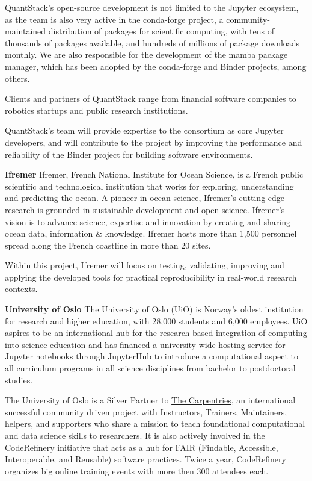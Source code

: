 QuantStack's open-source development is not limited to the Jupyter ecosystem, as the team
is also very active in the conda-forge project, a community-maintained distribution
of packages for scientific computing, with tens of thousands of packages available,
and hundreds of millions of package downloads monthly. We are also responsible for
the development of the mamba package manager, which has been adopted by the conda-forge
and Binder projects, among others.

Clients and partners of QuantStack range from financial software companies to robotics
startups and public research institutions.

QuantStack's team will provide expertise to the consortium as core Jupyter developers,
and will contribute to the project by improving the performance and reliability of the
Binder project for building software environments.

\noindent \textbf{Ifremer}
Ifremer, French National Institute for Ocean Science, is a French public
scientific and technological institution that works for exploring, understanding
and predicting the ocean. A pioneer in ocean science, Ifremer's cutting-edge
research is grounded in sustainable development and open science. Ifremer's
vision is to advance science, expertise and innovation by creating and sharing
ocean data, information \& knowledge. Ifremer hosts more than 1,500 personnel
spread along the French coastline in more than 20 sites.

Within this project, Ifremer will focus on testing, validating, improving and
applying the developed
tools for practical reproducibility in real-world research contexts.

\noindent \textbf{University of Oslo}
The University of Oslo (UiO) is Norway's oldest institution for research and
higher education, with 28,000 students and 6,000 employees. UiO aspires to be an
international hub for the research-based integration of computing into science
education and has financed a university-wide hosting service for Jupyter
notebooks through JupyterHub to introduce a computational aspect to all
curriculum programs in all science disciplines from bachelor to postdoctoral
studies.

The University of Oslo is a Silver Partner to \href{https://carpentries.org}{The
  Carpentries}, an international successful community driven project with
Instructors, Trainers, Maintainers, helpers, and supporters who share a mission
to teach foundational computational and data science skills to researchers. It
is also actively involved in the \href{https://coderefinery.org/}{CodeRefinery}
initiative that acts as a hub for FAIR (Findable, Accessible, Interoperable, and
Reusable) software practices. Twice a year, CodeRefinery organizes big online
training events with more then 300 attendees each.

